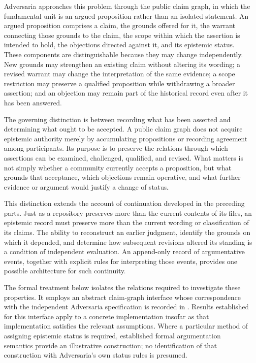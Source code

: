 \documentclass[11pt,twoside,openright]{book}
\theoremstyle{plain}
\theoremstyle{definition}
\theoremstyle{remark}
\begin{document}
Adversaria approaches this problem through the public claim
graph, in which the fundamental unit is an argued proposition
rather than an isolated statement. An argued proposition
comprises a claim, the grounds offered for it, the warrant
connecting those grounds to the claim, the scope within which
the assertion is intended to hold, the objections directed
against it, and its epistemic status. These components are
distinguishable because they may change independently. New
grounds may strengthen an existing claim without altering
its wording; a revised warrant may change the interpretation
of the same evidence; a scope restriction may preserve a
qualified proposition while withdrawing a broader assertion;
and an objection may remain part of the historical record
even after it has been answered.

The governing distinction is between recording what has
been asserted and determining what ought to be accepted.
A public claim graph does not acquire epistemic authority
merely by accumulating propositions or recording agreement
among participants. Its purpose is to preserve the relations
through which assertions can be examined, challenged,
qualified, and revised. What matters is not simply whether
a community currently accepts a proposition, but what
grounds that acceptance, which objections remain operative,
and what further evidence or argument would justify a
change of status.

This distinction extends the account of continuation
developed in the preceding parts. Just as a repository
preserves more than the current contents of its files,
an epistemic record must preserve more than the current
wording or classification of its claims. The ability to
reconstruct an earlier judgment, identify the grounds on
which it depended, and determine how subsequent revisions
altered its standing is a condition of independent
evaluation. An append-only record of argumentative events,
together with explicit rules for interpreting those events,
provides one possible architecture for such continuity.

The formal treatment below isolates the relations required
to investigate these properties. It employs an abstract
claim-graph interface whose correspondence with the
independent Adversaria specification is recorded in
. Results established for this interface
apply to a concrete implementation insofar as that
implementation satisfies the relevant assumptions. Where
a particular method of assigning epistemic status is
required, established formal argumentation semantics
provide an illustrative construction; no identification
of that construction with Adversaria's own status rules
is presumed.
\end{document}
